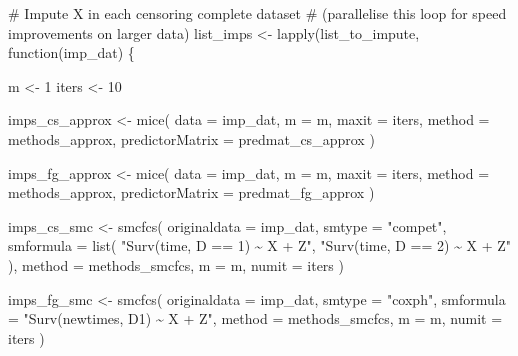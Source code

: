 \documentclass[
  12pt,
  a4paper,
]{article}
\newenvironment{Shaded}{\begin{snugshade}}{\end{snugshade}}
\newcommand{\AttributeTok}[1]{\textcolor[rgb]{0.40,0.45,0.13}{#1}}
\newcommand{\CommentTok}[1]{\textcolor[rgb]{0.37,0.37,0.37}{#1}}
\newcommand{\ControlFlowTok}[1]{\textcolor[rgb]{0.00,0.23,0.31}{#1}}
\newcommand{\DecValTok}[1]{\textcolor[rgb]{0.68,0.00,0.00}{#1}}
\newcommand{\FunctionTok}[1]{\textcolor[rgb]{0.28,0.35,0.67}{#1}}
\newcommand{\NormalTok}[1]{\textcolor[rgb]{0.00,0.23,0.31}{#1}}
\newcommand{\OtherTok}[1]{\textcolor[rgb]{0.00,0.23,0.31}{#1}}
\newcommand{\StringTok}[1]{\textcolor[rgb]{0.13,0.47,0.30}{#1}}
\begin{document}
\begin{Shaded}
\begin{Highlighting}[]
\CommentTok{\# Impute X in each censoring complete dataset}
\CommentTok{\# (parallelise this loop for speed improvements on larger data)}
\NormalTok{list\_imps }\OtherTok{\textless{}{-}} \FunctionTok{lapply}\NormalTok{(list\_to\_impute, }\ControlFlowTok{function}\NormalTok{(imp\_dat) \{}

\NormalTok{  m }\OtherTok{\textless{}{-}} \DecValTok{1}
\NormalTok{  iters }\OtherTok{\textless{}{-}} \DecValTok{10}
  
\NormalTok{  imps\_cs\_approx }\OtherTok{\textless{}{-}} \FunctionTok{mice}\NormalTok{(}
    \AttributeTok{data =}\NormalTok{ imp\_dat,}
    \AttributeTok{m =}\NormalTok{ m,}
    \AttributeTok{maxit =}\NormalTok{ iters,}
    \AttributeTok{method =}\NormalTok{ methods\_approx,}
    \AttributeTok{predictorMatrix =}\NormalTok{ predmat\_cs\_approx}
\NormalTok{  )}

\NormalTok{  imps\_fg\_approx }\OtherTok{\textless{}{-}} \FunctionTok{mice}\NormalTok{(}
    \AttributeTok{data =}\NormalTok{ imp\_dat,}
    \AttributeTok{m =}\NormalTok{ m,}
    \AttributeTok{maxit =}\NormalTok{ iters,}
    \AttributeTok{method =}\NormalTok{ methods\_approx,}
    \AttributeTok{predictorMatrix =}\NormalTok{ predmat\_fg\_approx}
\NormalTok{  )}

\NormalTok{  imps\_cs\_smc }\OtherTok{\textless{}{-}} \FunctionTok{smcfcs}\NormalTok{(}
    \AttributeTok{originaldata =}\NormalTok{ imp\_dat,}
    \AttributeTok{smtype =} \StringTok{"compet"}\NormalTok{,}
    \AttributeTok{smformula =} \FunctionTok{list}\NormalTok{(}
      \StringTok{"Surv(time, D == 1) \textasciitilde{} X + Z"}\NormalTok{,}
      \StringTok{"Surv(time, D == 2) \textasciitilde{} X + Z"}
\NormalTok{    ),}
    \AttributeTok{method =}\NormalTok{ methods\_smcfcs,}
    \AttributeTok{m =}\NormalTok{ m,}
    \AttributeTok{numit =}\NormalTok{ iters}
\NormalTok{  )}

\NormalTok{  imps\_fg\_smc }\OtherTok{\textless{}{-}} \FunctionTok{smcfcs}\NormalTok{(}
    \AttributeTok{originaldata =}\NormalTok{ imp\_dat,}
    \AttributeTok{smtype =} \StringTok{"coxph"}\NormalTok{,}
    \AttributeTok{smformula =} \StringTok{"Surv(newtimes, D1) \textasciitilde{} X + Z"}\NormalTok{,}
    \AttributeTok{method =}\NormalTok{ methods\_smcfcs,}
    \AttributeTok{m =}\NormalTok{ m,}
    \AttributeTok{numit =}\NormalTok{ iters}
\NormalTok{  )}


\end{Highlighting}
\end{Shaded}
\end{document}
